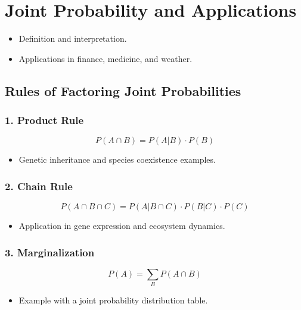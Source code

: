 \documentclass{article}
\begin{document}
\section*{Joint Probability and Applications}
\begin{itemize}
  \item Definition and interpretation.
  \item Applications in finance, medicine, and weather.
\end{itemize}

\subsection*{Rules of Factoring Joint Probabilities}
\subsubsection*{1. Product Rule}
\[ P(A \cap B) = P(A|B) \cdot P(B) \]
\begin{itemize}
  \item Genetic inheritance and species coexistence examples.
\end{itemize}

\subsubsection*{2. Chain Rule}
\[ P(A \cap B \cap C) = P(A|B \cap C) \cdot P(B|C) \cdot P(C) \]
\begin{itemize}
  \item Application in gene expression and ecosystem dynamics.
\end{itemize}

\subsubsection*{3. Marginalization}
\[ P(A) = \sum_{B} P(A \cap B) \]
\begin{itemize}
  \item Example with a joint probability distribution table.
\end{itemize}
\end{document}
